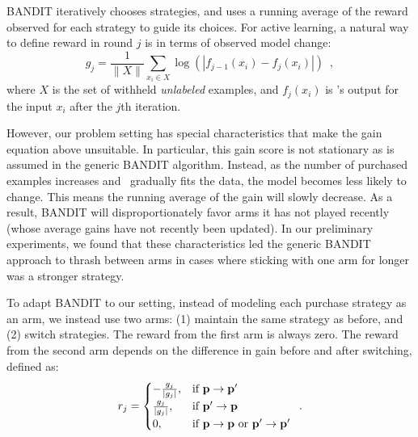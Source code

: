 \documentclass[10pt, conference, compsocconf]{IEEEtran}
\newcommand{\sys}{\Call{Hal}{}} %
\begin{document}
BANDIT iteratively chooses strategies, and uses a running average of the reward observed for each strategy to guide
its choices.  For active learning, a natural way to define reward in round $j$ is in terms of observed model change:
\begin{equation}
g_{j} = \frac{1}{\|X\|}\sum_{x_i \in X} \log{(|f_{j-1}(x_i) - f_{j}(x_i)|)}
\enspace ,
\end{equation}
where $X$ is the set of withheld {\em unlabeled} examples, and $f_{j}(x_i)$ is \sys's output for the 
input $x_i$ after the $j$th iteration.

However, our problem setting has special characteristics that make the gain equation above unsuitable.
In particular, this gain score is not stationary as is assumed in the generic BANDIT
algorithm. Instead,
as the number of purchased examples increases and \sys\ gradually fits the data, the model becomes less likely to change. 
This means the running average of the gain will slowly decrease.  As a result,
BANDIT will disproportionately favor arms it has not played recently (whose average gains have not recently been updated).
In our preliminary experiments, we found that these characteristics led the generic BANDIT approach to thrash 
between arms in cases where sticking with one arm for longer was a stronger strategy.

To adapt BANDIT to our setting, instead of modeling each purchase strategy as
an arm, we instead use
two arms: (1) maintain the same strategy as before, and (2) switch strategies.
The reward from the first arm is always zero.  The reward from the second arm
depends on the difference in gain before and after switching, defined as:
\vspace{-0.1in}
\begin{equation}
\label{eq:reward}
    r_{j}=
\begin{cases}
   -\frac{g_{j}}{|g_{j}|}, & \text{if } {\bf p}\rightarrow{\bf p'}\\
    \frac{g_{j}}{|g_{j}|}, & \text{if } {\bf p'}\rightarrow{\bf p}\\
    0, & \text{if } {\bf p}\rightarrow{\bf p} \text{ or } {\bf p'}\rightarrow{\bf p'}\\
\end{cases}
\enspace .
\end{equation}


\end{document}
